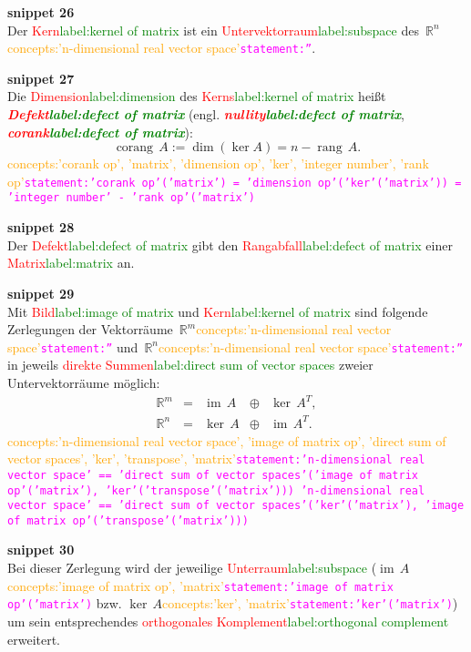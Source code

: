 \documentclass[a4paper,twoside,english,ngerman,deutsch,german,sectrefs,envcountsame,envcountchap]{svmono}
\newcommand{\setref}[2]{\textcolor{red}{#1}\textcolor{green}{#2}}
\newcommand{\snippet}[1]{\textbf{snippet #1}\\}
\newcommand{\eqnote}[2]{\textcolor{orange}{#1}\textcolor{magenta}{\texttt{#2}}}
\begin{document}
\snippet{26}
Der \setref{Kern}{label:kernel of matrix} ist ein \setref{Untervektorraum}{label:subspace} des~${\mathbb{R}}^{n}$\eqnote{concepts:'n-dimensional real vector space'}{statement:''}.

\snippet{27}
Die \setref{Dimension}{label:dimension} des \setref{Kerns}{label:kernel of matrix} heißt \textbf{\em \setref{Defekt}{label:defect of matrix}} (engl. \textbf{\em \setref{nullity}{label:defect of matrix}},
\textbf{\em \setref{corank}{label:defect of matrix}}):
\begin{equation}
{\operatorname{corang}}\,A:=\dim(\ker A)=n-{\operatorname{rang}}\,A.\label{eq:corank}
\end{equation}\eqnote{concepts:'corank op', 'matrix', 'dimension op', 'ker', 'integer number', 'rank op'}{statement:'corank op'('matrix') = 'dimension op'('ker'('matrix')) = 'integer number' - 'rank op'('matrix')}

\snippet{28}
Der \setref{Defekt}{label:defect of matrix} gibt den \setref{Rangabfall}{label:defect of matrix} einer \setref{Matrix}{label:matrix} an.

\snippet{29}
Mit \setref{Bild}{label:image of matrix} und \setref{Kern}{label:kernel of matrix} sind folgende Zerlegungen der Vektorräume~${\mathbb{R}}^{m}$\eqnote{concepts:'n-dimensional real vector space'}{statement:''} und~${\mathbb{R}}^{n}$\eqnote{concepts:'n-dimensional real vector space'}{statement:''} in jeweils \setref{direkte Summen}{label:direct sum of vector spaces} zweier Untervektorräume möglich:
\begin{equation}
\begin{array}{lcccc}
{\mathbb{R}}^{m} & = & {\operatorname{im}}\,A & \oplus & \ker\,A^{T},\\ {\mathbb{R}}^{n} & = & \ker\,A & \oplus & {\operatorname{im}}\,A^{T}.
\end{array}\label{eq:zerleg-im-ker}
\end{equation}\eqnote{concepts:'n-dimensional real vector space', 'image of matrix op', 'direct sum of vector spaces', 'ker', 'transpose', 'matrix'}{statement:'n-dimensional real vector space' == 'direct sum of vector spaces'('image of matrix op'('matrix'), 'ker'('transpose'('matrix')))
'n-dimensional real vector space' == 'direct sum of vector spaces'('ker'('matrix'), 'image of matrix op'('transpose'('matrix')))}

\snippet{30}
Bei dieser Zerlegung wird der jeweilige \setref{Unterraum}{label:subspace} ($\operatorname{im}\,A$\eqnote{concepts:'image of matrix op', 'matrix'}{statement:'image of matrix op'('matrix')} bzw. $\ker\,A$\eqnote{concepts:'ker', 'matrix'}{statement:'ker'('matrix')}) um sein entsprechendes \setref{orthogonales Komplement}{label:orthogonal complement} erweitert.
\end{document}
